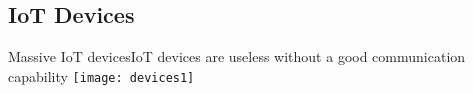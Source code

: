 





\subsection{IoT Devices}
\begin{frame}{Massive IoT devices}{IoT devices are useless without a good communication capability}
  \centering
  \texttt{[image: devices1]}
\end{frame}

